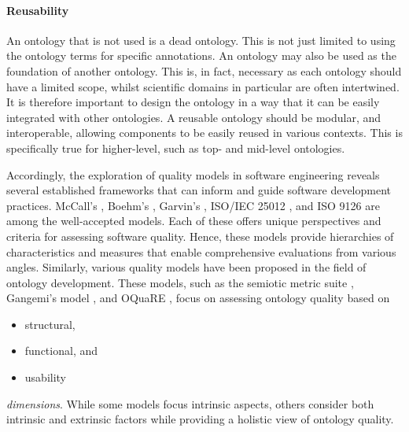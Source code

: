 \paragraph{Reusability}

An ontology that is not used is a dead ontology. This is not just limited to using the ontology terms for specific annotations. An ontology may also be used as the foundation of another ontology. This is, in fact, necessary as each ontology should have a limited scope, whilst scientific domains in particular are often intertwined. It is therefore important to design the ontology in a way that it can be easily integrated with other ontologies. A reusable ontology should be modular, and interoperable, allowing components to be easily reused in various contexts. This is specifically true for higher-level, such as top- and mid-level ontologies. 





Accordingly, the exploration of quality models in software engineering reveals several established frameworks that can inform and guide software development practices. McCall’s \cite{McCallModel1978}, Boehm’s \cite{BoehmQuality1976}, Garvin’s \cite{GarvinQuality1984}, ISO/IEC 25012 \cite{ISO25012}, and ISO 9126 \cite{ISO9126-2, ISO9126-3, ISO9126-4} are among the well-accepted models. Each of these offers unique perspectives and criteria for assessing software quality. Hence, these models provide hierarchies of characteristics and measures that enable comprehensive evaluations from various angles.
Similarly, various quality models have been proposed in the field of ontology development. These models, such as the semiotic metric suite \cite{BurtonQuality2005}, Gangemi's model \cite{GangemiOntoEval2006}, and OQuaRE \cite{DuqueOQuaRE2011}, focus on assessing ontology quality based on 
\begin{itemize}
    \item structural, 
    \item functional, and 
    \item usability
\end{itemize} \textit{dimensions}. While some models focus intrinsic aspects, others consider both intrinsic and extrinsic factors while providing a holistic view of ontology quality. 

